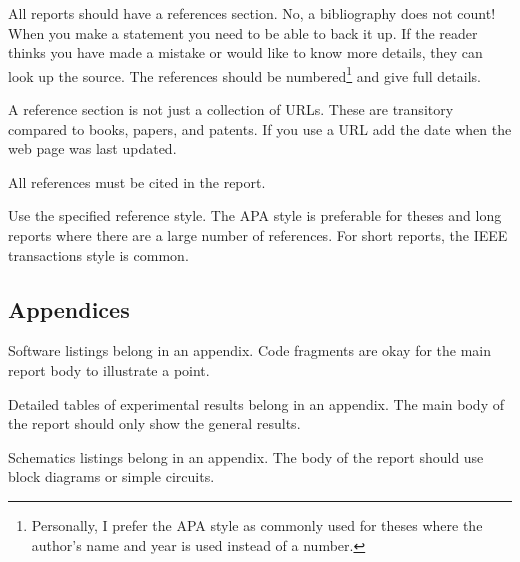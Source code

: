 \documentclass[a4paper,12pt]{article}
\newcounter{foo}
\begin{document}
\begin{list}{R-}{}

\item All reports should have a references section.  No, a
  bibliography does not count!  When you make a statement you need to
  be able to back it up.  If the reader thinks you have made a mistake
  or would like to know more details, they can look up the source.
  The references should be numbered\footnote{Personally, I prefer the
    APA style as commonly used for theses where the author's name and
    year is used instead of a number.} and give full details.

\item A reference section is not just a collection of URLs.  These are
  transitory compared to books, papers, and patents.  If you use a URL
  add the date when the web page was last updated.

\item All references must be cited in the report.

\item Use the specified reference style.  The APA style is preferable
  for theses and long reports where there are a large number of
  references.  For short reports, the IEEE transactions style is
  common.
\end{list}


\subsection{Appendices}

\begin{list}{X-}{}
\item Software listings belong in an appendix.  Code fragments are
  okay for the main report body to illustrate a point.

\item Detailed tables of experimental results belong in an appendix.
  The main body of the report should only show the general results.

\item Schematics listings belong in an appendix.  The body of the
  report should use block diagrams or simple circuits.

\end{list}






\end{document}
